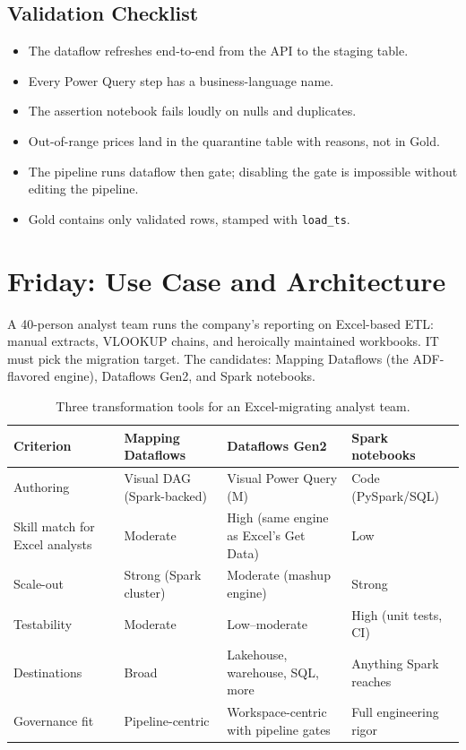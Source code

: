 \subsection{Validation Checklist}
\begin{itemize}
    \item The dataflow refreshes end-to-end from the API to the staging table.
    \item Every Power Query step has a business-language name.
    \item The assertion notebook fails loudly on nulls and duplicates.
    \item Out-of-range prices land in the quarantine table with reasons, not in Gold.
    \item The pipeline runs dataflow then gate; disabling the gate is impossible without editing the pipeline.
    \item Gold contains only validated rows, stamped with \texttt{load\_ts}.
\end{itemize}

\section{Friday: Use Case and Architecture}
A 40-person analyst team runs the company's reporting on Excel-based ETL: manual extracts, VLOOKUP chains, and heroically maintained workbooks. IT must pick the migration target. The candidates: Mapping Dataflows (the ADF-flavored engine), Dataflows Gen2, and Spark notebooks.

\begin{table}[H]
\centering
\small
\begin{tabular}{@{}p{3.0cm}p{3.6cm}p{3.6cm}p{3.6cm}@{}}
\toprule
\textbf{Criterion} & \textbf{Mapping Dataflows} & \textbf{Dataflows Gen2} & \textbf{Spark notebooks} \\
\midrule
Authoring & Visual DAG (Spark-backed) & Visual Power Query (M) & Code (PySpark/SQL) \\
Skill match for Excel analysts & Moderate & High (same engine as Excel's Get Data) & Low \\
Scale-out & Strong (Spark cluster) & Moderate (mashup engine) & Strong \\
Testability & Moderate & Low--moderate & High (unit tests, CI) \\
Destinations & Broad & Lakehouse, warehouse, SQL, more & Anything Spark reaches \\
Governance fit & Pipeline-centric & Workspace-centric with pipeline gates & Full engineering rigor \\
\bottomrule
\end{tabular}
\caption{Three transformation tools for an Excel-migrating analyst team.}
\label{tab:chapter10-evaluation}
\end{table}

